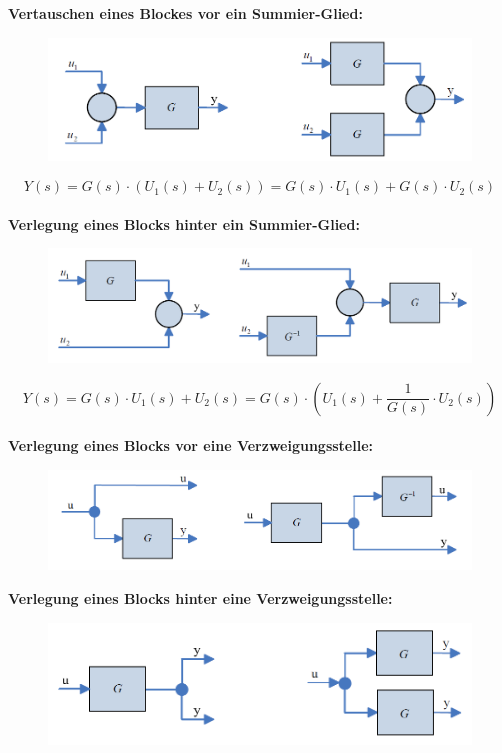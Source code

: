 \documentclass[10pt,a4paper]{article}
\begin{document}
\textbf{Vertauschen eines Blockes vor ein Summier-Glied:}
\begin{figure}[H]
	\includegraphics[width = \columnwidth]{imgs/vertauschen_block_vor_summierer.png}
\end{figure}
$$
	Y(s) = G(s) ⋅(U_1(s) + U_2(s)) = G(s) ⋅ U_1(s) + G(s) ⋅ U_2(s)
$$ \\

\textbf{Verlegung eines Blocks hinter ein Summier-Glied:}
\begin{figure}[H]
	\includegraphics[width = \columnwidth]{imgs/verlegung_block_hinter_summierer.png}
\end{figure}
$$
	Y(s) = G(s) ⋅U_1(s) + U_2(s) = G(s) ⋅ (U_1(s) + \frac{1}{G(s)} ⋅ U_2(s))
$$ \\

\textbf{Verlegung eines Blocks vor eine Verzweigungsstelle:}
\begin{figure}[H]
	\includegraphics[width = \columnwidth]{imgs/verlegung_block_vor_verzweigung.png}
\end{figure}

\textbf{Verlegung eines Blocks hinter eine Verzweigungsstelle:}
\begin{figure}[H]
	\includegraphics[width = \columnwidth]{imgs/verlegung_block_hinter_verzweigung.png}
\end{figure}
\end{document}
